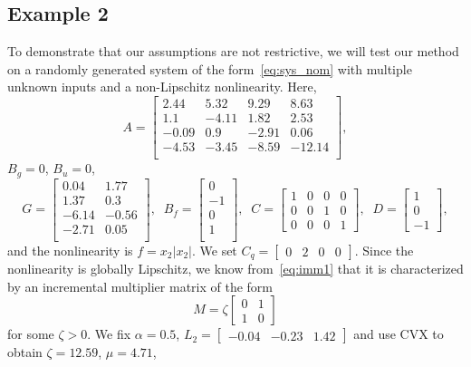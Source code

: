 \documentclass[times, doublespace]{rncauth}
\begin{document}
\subsection{Example 2}
To demonstrate that our assumptions are not restrictive, we will test our method on a randomly generated system of the form~\eqref{eq:sys_nom} with multiple unknown inputs and a non-Lipschitz nonlinearity. Here,
\[
A = \begin{bmatrix}
2.44 & 5.32 & 9.29 & 8.63 \\ 
1.1 & -4.11 & 1.82 & 2.53 \\ 
-0.09 & 0.9 & -2.91 & 0.06 \\ 
-4.53 & -3.45 & -8.59 & -12.14 \\ 
\end{bmatrix},
\]
$B_g = 0$, $B_u = 0$,
\[
G = \begin{bmatrix}
0.04 & 1.77 \\ 
1.37 & 0.3 \\ 
-6.14 & -0.56 \\ 
-2.71 & 0.05 \\ 
\end{bmatrix}, \;\; B_f = \begin{bmatrix}
0 \\ 
-1 \\ 
0 \\ 
1 \\ 
\end{bmatrix}, \;\;
C = \begin{bmatrix}
1 & 0 & 0 & 0\\
0 & 0 & 1 & 0\\
0 & 0 & 0 & 1
\end{bmatrix}, \;\; D = \begin{bmatrix}
1 \\ 0 \\ -1
\end{bmatrix},
\]
and the nonlinearity is $f = x_2|x_2|$. We set $C_q = \begin{bmatrix}
0 & 2 & 0 & 0
\end{bmatrix}$. Since the nonlinearity is globally Lipschitz, we know from~\eqref{eq:imm1} that it is characterized by an incremental multiplier matrix of the form 
\[
M = \zeta\begin{bmatrix}
0 & 1 \\ 1 & 0
\end{bmatrix}
\]
for some $\zeta>0$. We fix $\alpha = 0.5$, $L_2 = \begin{bmatrix}
-0.04 & -0.23 & 1.42 
\end{bmatrix}$ and use CVX to obtain $\zeta = 12.59$, $\mu = 4.71$,
\end{document}
